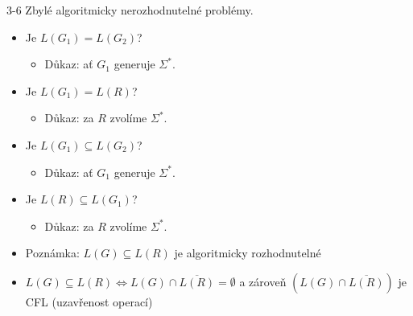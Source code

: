     
    \begin{frame}{}
    \begin{proofm}{3-6}
    Zbylé algoritmicky nerozhodnutelné problémy.
    \begin{itemize}
        \item[3] 	 Je $L(G_1)= L(G_2)$? 
    \begin{itemize}
        \item 	Důkaz: ať $G_1$ generuje $\Sigma^*$.
    \end{itemize}
    \pause
    \item[4] 	 Je $L(G_1)= L(R)$?
    \begin{itemize}
        \item  Důkaz: za $R$ zvolíme $\Sigma^*$.
    \end{itemize}
    \pause
    \item[5] 	 Je $L(G_1)\subseteq L(G_2)$?
    \begin{itemize}
        \item  Důkaz: ať $G_1$ generuje $\Sigma^*$.
    \end{itemize}
    \pause
    \item[6] 
         Je $L(R)\subseteq L(G_1)$?
    \begin{itemize}
        \item 	Důkaz: za $R$ zvolíme $\Sigma^*$.
    \end{itemize}
    \end{itemize}
    \end{proofm}
    \pause
    \begin{itemize}
        \item Poznámka: $L(G)\subseteq L(R)$ je algoritmicky rozhodnutelné
        \item[] $L(G)\subseteq L(R) \Leftrightarrow L(G)\cap \overline{L(R)}=\emptyset$ a zároveň $(L(G)\cap \overline{L(R)})$ je CFL (uzavřenost operací)
    \end{itemize}
    \end{frame}
    
